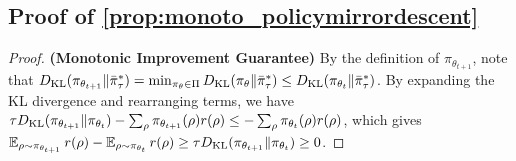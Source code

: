 \subsection{Proof of \cref{prop:monoto_policymirrordescent}}
\label{appsec:monoto_policymirrordescent}
\begin{proof}
	{\bf (Monotonic Improvement Guarantee)} By the definition of $\pi_{\theta_{t+1}}$, note that $D_{\mathrm{KL}}(\pi_{\theta_{t+1}} \| \bar{\pi}_\tau^*)  = \min_{\pi_\theta \in \Pi}{ D_{\mathrm{KL}}(\pi_\theta \| \bar{\pi}_\tau^*)} \leq D_{\mathrm{KL}}(\pi_{\theta_{t}} \| \bar{\pi}_\tau^*)$. By expanding the KL divergence and rearranging terms, we have $ \tau D_{\mathrm{KL}}(\pi_{\theta_{t+1}} \| \pi_{\theta_{t}}) - \sum_{\rho}{ \pi_{\theta_{t+1}}(\rho) r(\rho) } \leq - \sum_{\rho}{ \pi_{\theta_{t}}(\rho) r(\rho) }$, which gives $\operatorname*{\mathbb{E}}_{\rho \sim \pi_{\theta_{t+1}}}{  r(\rho)} - \operatorname*{\mathbb{E}}_{\rho \sim \pi_{\theta_{t}}}{  r(\rho)} \geq \tau D_{\mathrm{KL}}(\pi_{\theta_{t+1}} \| \pi_{\theta_{t}}) \geq 0$.
	

\end{proof}
